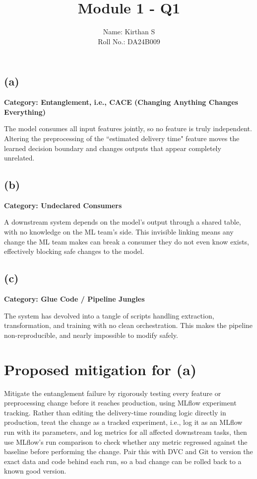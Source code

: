 \documentclass[11pt]{article}
\title{\vspace{-1.2cm}Module 1 - Q1}
\author{Name: Kirthan S\\
Roll No.: DA24B009}
\begin{document}
\date{}
\maketitle
\vspace{-0.6cm}

\subsection*{(a)}
\textbf{Category: Entanglement, i.e., CACE (Changing Anything Changes Everything)}

The model consumes all input features jointly, so no feature is truly independent. Altering the preprocessing of the ``estimated delivery time" feature moves the learned decision
boundary and changes outputs that appear completely unrelated.

\subsection*{(b)}
\textbf{Category: Undeclared Consumers}

A downstream system depends on the model's output through a shared table, with no knowledge on the ML team's side. This invisible linking means any change the ML team makes can break a consumer they do not even know exists, effectively blocking safe changes to the model.

\subsection*{(c)}
\textbf{Category: Glue Code / Pipeline Jungles}

The system has devolved into a tangle of scripts handling extraction, transformation, and training with no clean orchestration. This makes the pipeline non-reproducible, and nearly impossible to modify safely.

\section*{Proposed mitigation for (a)}

Mitigate the entanglement failure by rigorously testing every feature or preprocessing change before it reaches production, using MLflow experiment tracking. Rather than editing the delivery-time rounding logic directly in production,
treat the change as a tracked experiment, i.e., log it as an MLflow run with its parameters, and log metrics for all affected downstream tasks, then use MLflow's run comparison to check whether any metric regressed against the baseline before performing the change. Pair this with DVC and Git to version the exact data and code behind each run, so a
bad change can be rolled back to a known good version.
\end{document}
